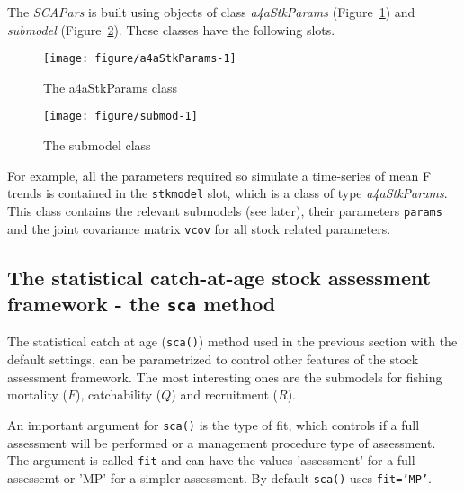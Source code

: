 \documentclass[a4paper,english,10pt]{article}\usepackage[]{graphicx}\usepackage[]{color}
\makeatletter
\def\maxwidth{ %
  \ifdim\Gin@nat@width>\linewidth
    \linewidth
  \else
    \Gin@nat@width
  \fi
}
\newenvironment{knitrout}{}{} %
\newcommand{\code}[1]{{\texttt{#1}}}
\newcommand{\class}[1]{{\textit{#1}}}
\makeatother
\begin{document}
The \class{SCAPars} is built using objects of class \class{a4aStkParams} (Figure~\ref{fig:a4aStkParams}) and \class{submodel} (Figure~\ref{fig:submod}). These classes have the following slots.

\begin{knitrout}
\color{fgcolor}\begin{figure}[H]

{\centering \texttt{[image: figure/a4aStkParams-1]} 

}

\caption[The a4aStkParams class]{The a4aStkParams class}\label{fig:a4aStkParams}
\end{figure}


\end{knitrout}

\begin{knitrout}
\color{fgcolor}\begin{figure}[H]

{\centering \texttt{[image: figure/submod-1]} 

}

\caption[The submodel class]{The submodel class}\label{fig:submod}
\end{figure}


\end{knitrout}

For example, all the parameters required so simulate a time-series of mean F trends is contained in the \code{stkmodel} slot, which is a class of type \class{a4aStkParams}. This class contains the relevant submodels (see later), their parameters \code{params} and the joint covariance matrix \code{vcov} for all stock related parameters.

\subsection{The statistical catch-at-age stock assessment framework - the \code{sca} method}

The statistical catch at age (\code{sca()}) method used in the previous section with the default settings, can be parametrized to control other features of the stock assessment framework. The most interesting ones are the submodels for fishing mortality ($F$), catchability ($Q$) and recruitment ($R$). 

An important argument for \code{sca()} is the type of fit, which controls if a full assessment will be performed or a management procedure type of assessment. The argument is called \code{fit} and can have the values 'assessment' for a full assessemt or 'MP' for a simpler assessment. By default \code{sca()} uses \code{fit='MP'}. 
\end{document}

